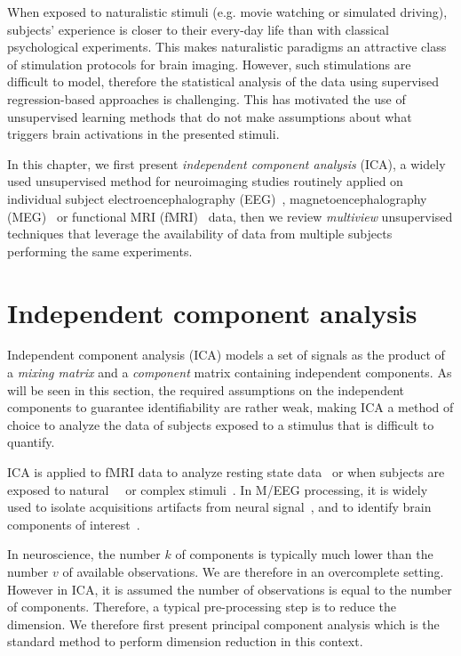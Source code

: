 When exposed to naturalistic stimuli (e.g. movie watching or simulated driving), subjects' experience is closer to their every-day life than with classical
psychological experiments.
% 
This makes naturalistic paradigms an attractive class of
stimulation protocols for brain imaging.
%
However, such stimulations are difficult to model, therefore the statistical analysis of the data using supervised regression-based approaches is challenging.
This has motivated the use of unsupervised learning methods that do not make
assumptions about what triggers brain activations in the presented stimuli.

In this chapter, we first present \emph{independent component analysis} (ICA), a widely used
unsupervised method for neuroimaging studies routinely applied on individual
subject electroencephalography (EEG)~\cite{makeig1996independent},
magnetoencephalography (MEG)~\cite{vigario1998independent} or functional MRI
(fMRI)~\cite{mckeown1998independent} data, then we review \emph{multiview} unsupervised 
techniques that leverage the availability of data from multiple subjects
performing the same experiments. 

\section{Independent component analysis}
\label{sec:ica}
Independent component analysis (ICA) models a set of signals as the product of a \emph{mixing matrix} and a
\emph{component} matrix containing independent components. As will be seen in this
section, the required assumptions on the independent components to guarantee
identifiability are rather weak, making ICA a method of choice to analyze the
data of subjects exposed to a stimulus that is difficult to quantify.

ICA is applied to fMRI data to analyze resting state
data~\cite{beckmann2005investigations} or when subjects are
exposed to natural~\cite{malinen2007towards}~\cite{bartels2005brain} or complex stimuli~\cite{calhoun2002different}. 
In M/EEG processing, it is widely used to isolate acquisitions artifacts from neural signal~\cite{jung1998extended}, and to identify brain components of interest~\cite{vigario2000independent, delorme2012independent}.

In neuroscience, the number $k$ of components is typically much lower than the number $v$
of available observations. We are therefore in an overcomplete setting.
However in ICA, it is assumed the number of observations is equal to the number
of components. Therefore, a
typical pre-processing step is to reduce the dimension. We therefore first
present principal component analysis which is the standard method to perform
dimension reduction in this context.

